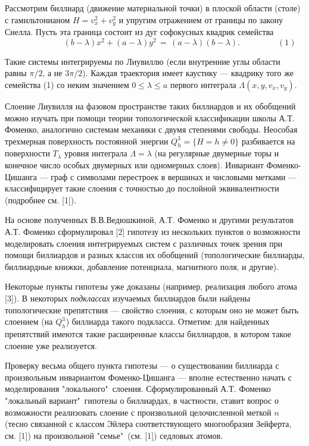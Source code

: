 \vzmscaption

Рассмотрим биллиард (движение материальной точки) в плоской области (столе) с гамильтонианом $H = v_x^2 + v_y^2$ и упругим отражением от границы по закону Снелла. Пусть эта граница состоит из дуг софокусных квадрик семейства
\[ \qquad \qquad \qquad (b - \lambda) x^2 + (a - \lambda) y^2 \, = \, (a - \lambda) (b - \lambda). \qquad\qquad \,\,\, (1)\]

Такие системы интегрируемы по Лиувиллю (если внутренние углы области равны $\pi\slash 2$, а не $3\pi\slash 2$). Каждая траектория имеет каустику --- квадрику того же семейства (1) со неким значением $0 \le \lambda \le a$ первого интеграла $\Lambda(x, y, v_x, v_y)$. 

Слоение Лиувилля на фазовом пространстве таких биллиардов и их обобщений можно изучать при помощи теории топологической классификации школы А.Т. Фоменко, аналогично системам механики с двумя степенями свободы. Неособая трехмерная поверхность постоянной энергии $Q^3_h = \{H = h \ne 0\}$ разбивается на поверхности $T_\lambda$ уровня интеграла $\Lambda = \lambda$ (на регулярные двумерные торы и конечное число особых двумерных или одномерных слоев). Инвариант Фоменко-Цишанга --- граф с символами перестроек в вершинах и числовыми метками --- классифицирует такие слоения с точностью до послойной эквивалентности (подробнее см. [1]).

На основе полученных В.В.Ведюшкиной, А.Т. Фоменко и другими результатов А.Т. Фоменко сформулировал [2] гипотезу из нескольких пунктов о возможности моделировать слоения интегрируемых систем с различных точек зрения при помощи биллиардов и разных классов их обобщений (топологические биллиарды, биллиардные книжки, добавление потенциала, магнитного поля, и другие).

Некоторые пункты гипотезы уже доказаны (например, реализация любого атома [3]). В некоторых \textit{подклассах} изучаемых биллиардов были найдены топологические препятствия --- свойство слоения, с которым оно не может быть слоением (на $Q^3_h$) биллиарда такого подкласса. Отметим: для найденных препятствий имеются такие расширенные классы биллиардов, в котором такое слоение уже реализуется.

Проверку весьма общего пункта гипотезы --- о существовании биллиарда с произвольным инвариантом Фоменко-Цишанга --- вполне естественно начать с моделирования "локального"\, слоения. Сформулированный А.Т. Фоменко "локальный вариант"\, гипотезы о биллиардах, в частности, ставит вопрос о возможности реализовать слоение с произвольной целочисленной меткой $n$ (тесно связанной с классом Эйлера соответствующего многообразия Зейферта, см. [1]) на произвольной "семье"\, (см. [1]) седловых атомов.

